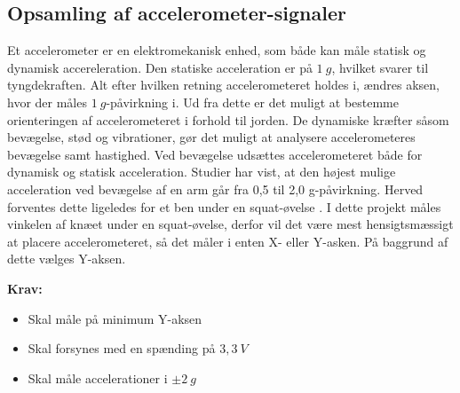 \subsection{Opsamling af accelerometer-signaler}
Et accelerometer er en elektromekanisk enhed, som både kan måle statisk og dynamisk accereleration. Den statiske acceleration er på $1~g$, hvilket svarer til tyngdekraften. Alt efter hvilken retning accelerometeret holdes i, ændres aksen, hvor der måles $1~g$-påvirkning i.
Ud fra dette er det muligt at bestemme orienteringen af accelerometeret i forhold til jorden. De dynamiske kræfter såsom bevægelse, stød og vibrationer, gør det muligt at analysere accelerometeres bevægelse samt hastighed. Ved bevægelse udsættes accelerometeret både for dynamisk og statisk acceleration. Studier har vist, at den højest mulige acceleration ved bevægelse af en arm går fra 0,5 til 2,0 g-påvirkning. Herved forventes dette ligeledes for et ben under en squat-øvelse \citep{bernmarka2002}. I dette projekt måles vinkelen af knæet under en squat-øvelse, derfor vil det være mest hensigtsmæssigt at placere accelerometeret, så det måler i enten X- eller Y-asken. På baggrund af dette vælges Y-aksen.

\vspace{3mm}

\textbf{Krav:}
\begin{itemize}
\item Skal måle på minimum Y-aksen
\item Skal forsynes med en spænding på $3,3~V$
\item Skal måle accelerationer i $\pm2~g$
\end{itemize}